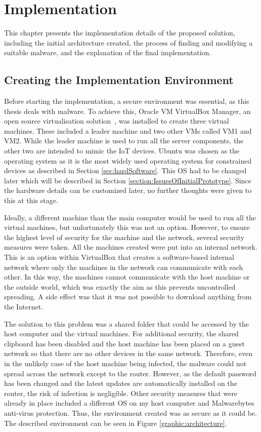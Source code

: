 
\chapter{Implementation}

This chapter presents the implementation details of the proposed solution, including the initial architecture created, the process of finding and modifying a suitable malware, and the explanation of the final implementation.

\section{Creating the Implementation Environment} \label{sec:prerequisites}
Before starting the implementation, a secure environment was essential, as this thesis deals with malware. To achieve this, Oracle VM VirtualBox Manager, an open source virtualisation solution~\cite{website:oracleVirtualBox}, was installed to create three virtual machines. These included a leader machine and two other VMs called VM1 and VM2. While the leader machine is used to run all the server components, the other two are intended to mimic the IoT devices. Ubuntu was chosen as the operating system as it is the most widely used operating system for constrained devices as described in Section \ref{sec:hardSoftware}. This OS had to be changed later which will be described in Section \ref{section:IssuesOfInitialPrototype}. Since the hardware details can be customized later, no further thoughts were given to this at this stage. 

Ideally, a different machine than the main computer would be used to run all the virtual machines, but unfortunately this was not an option. However, to ensure the highest level of security for the machine and the network, several security measures were taken. All the machines created were put into an internal network. This is an option within VirtualBox that creates a software-based internal network where only the machines in the network can communicate with each other. In this way, the machines cannot communicate with the host machine or the outside world, which was exactly the aim as this prevents uncontrolled spreading. A side effect was that it was not possible to download anything from the Internet. 

The solution to this problem was a shared folder that could be accessed by the host computer and the virtual machines. For additional security, the shared clipboard has been disabled and the host machine has been placed on a guest network so that there are no other devices in the same network. Therefore, even in the unlikely case of the host machine being infected, the malware could not spread across the network except to the router. However, as the default password has been changed and the latest updates are automatically installed on the router, the risk of infection is negligible. Other security measures that were already in place included a different OS on my host computer and Malwarebytes anti-virus protection. Thus, the environment created was as secure as it could be. The described environment can be seen in Figure \ref{graphic:architecture}.


